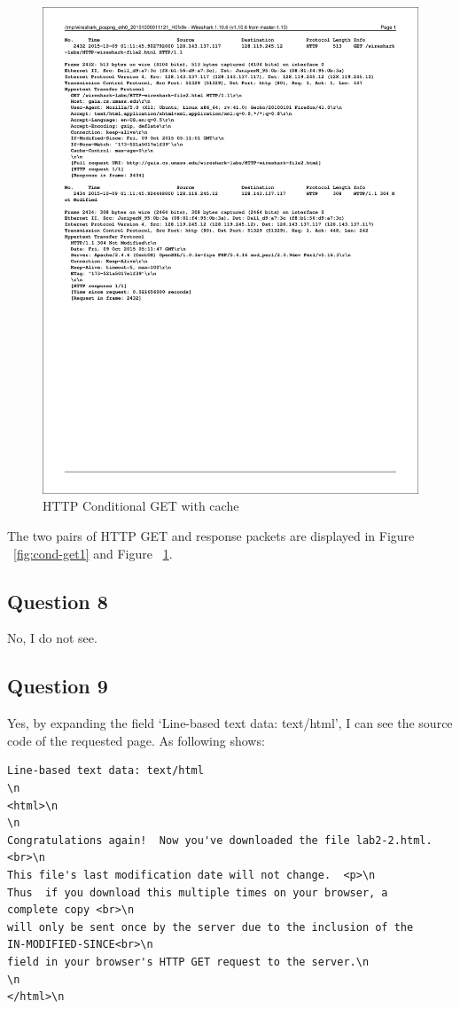 \documentclass[titlepage, paper=a4, fontsize=11pt]{scrartcl} %
\numberwithin{equation}{section} %
\numberwithin{figure}{section} %
\numberwithin{table}{section} %
\begin{document}
\begin{figure}[!ht]
    \includegraphics[width=\textwidth]{images/cond-get2.pdf}
    \caption{HTTP Conditional GET with cache}
    \label{fig:cond-get2}
\end{figure}

\newpage
The two pairs of HTTP GET and response packets are displayed in Figure ~\ref{fig:cond-get1}
and Figure ~\ref{fig:cond-get2}.

\subsection*{Question 8}
No, I do not see.
\\


\subsection*{Question 9}
Yes, by expanding the field `Line-based text data: text/html', I can see the source code of
the requested page. As following shows:
\begin{verbatim}
Line-based text data: text/html
\n
<html>\n
\n
Congratulations again!  Now you've downloaded the file lab2-2.html.
<br>\n
This file's last modification date will not change.  <p>\n
Thus  if you download this multiple times on your browser, a
complete copy <br>\n
will only be sent once by the server due to the inclusion of the
IN-MODIFIED-SINCE<br>\n
field in your browser's HTTP GET request to the server.\n
\n
</html>\n
\end{verbatim}
\end{document}
